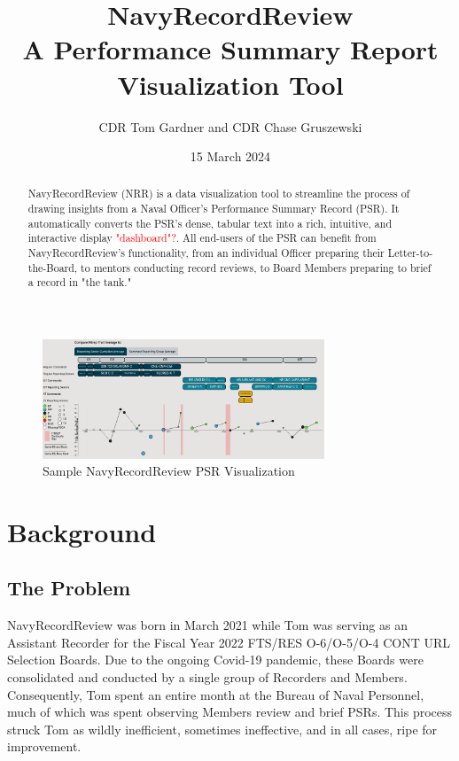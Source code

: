 \documentclass[UTF8]{article}
\begin{document}
\title{
  NavyRecordReview \\
  \large A Performance Summary Report Visualization Tool
}

\author{CDR Tom Gardner and CDR Chase Gruszewski}
\date{15 March 2024}
\maketitle


\begin{abstract}
NavyRecordReview (NRR) is a data visualization tool to streamline the process of
drawing insights from a Naval Officer's Performance Summary Record (PSR). It 
automatically converts the PSR's dense, tabular text into a rich, intuitive, 
and interactive display \textcolor{red}{"dashboard"?}. All end-users of the PSR
can benefit from NavyRecordReview's functionality, from an individual Officer 
preparing their Letter-to-the-Board, to mentors conducting record reviews, to
Board Members preparing to brief a record in "the tank." 
\end{abstract}

\begin{figure}[h!]
 \centering
 \includegraphics[width=0.75\textwidth]{nrr_dashboard.png}
 \caption{Sample NavyRecordReview PSR Visualization}
\end{figure}


\section{Background}
\subsection{The Problem}
NavyRecordReview was born in March 2021 while Tom was serving as an Assistant
Recorder for the Fiscal Year 2022 FTS/RES O-6/O-5/O-4 CONT URL Selection Boards.
Due to the ongoing Covid-19 pandemic, these Boards were consolidated and
conducted by a single group of Recorders and Members. Consequently, Tom spent an
entire month at the Bureau of Naval Personnel, much of which was spent
observing Members review and brief PSRs. This process struck Tom as wildly
inefficient, sometimes ineffective, and in all cases, ripe for improvement.\\
\end{document}
